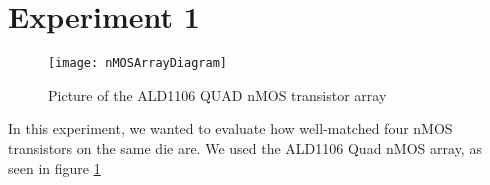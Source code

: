 \section*{Experiment 1}

\begin{figure}[H]
\centering
\texttt{[image: nMOSArrayDiagram]}
\caption{Picture of the ALD1106 QUAD nMOS transistor array}
\label{fig:ald1106}
\end{figure}


In this experiment, we wanted to evaluate how well-matched four nMOS transistors on the same die are. We used the ALD1106 Quad nMOS array, as seen in figure \ref{fig:ald1106}
